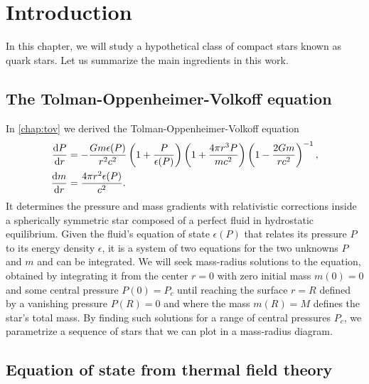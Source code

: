 \section{Introduction}



In this chapter, we will study a hypothetical class of compact stars known as quark stars.
Let us summarize the main ingredients in this work.

\subsection{The Tolman-Oppenheimer-Volkoff equation}

In \cref{chap:tov} we derived the Tolman-Oppenheimer-Volkoff equation
\begin{subequations}
\begin{align}
	\odv{P}{r} &= -\frac{G m \epsilon(P)}{r^2 c^2} \left( 1 + \frac{P}{\epsilon(P)} \right) \left( 1 + \frac{4 \pi r^3 P}{m c^2} \right) \left( 1 - \frac{2 G m}{r c^2} \right)^{-1} , \\
	\odv{m}{r} &= \frac{4 \pi r^2 \epsilon(P)}{c^2} .
\end{align}
\end{subequations}
It determines the pressure and mass gradients with relativistic corrections inside a spherically symmetric star composed of a perfect fluid in hydrostatic equilibrium.
Given the fluid's equation of state $\epsilon(P)$ that relates its pressure $P$ to its energy density $\epsilon$, it is a system of two equations for the two unknowns $P$ and $m$ and can be integrated.
We will seek mass-radius solutions to the equation, obtained by integrating it from the center $r=0$ with zero initial mass $m(0) = 0$ and some central pressure $P(0) = P_c$ until reaching the surface $r=R$ defined by a vanishing pressure $P(R) = 0$ and where the mass $m(R) = M$ defines the star's total mass.
By finding such solutions for a range of central pressures $P_c$, we parametrize a sequence of stars that we can plot in a mass-radius diagram.

\subsection{Equation of state from thermal field theory}

